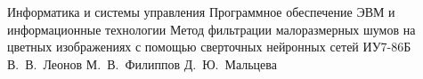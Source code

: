 \documentclass{bmstu}
\begin{document}
\def\labelitemi{---}

\makecourseworktitle
    {Информатика и системы управления} %
    {Программное обеспечение ЭВМ и информационные технологии} %
    {Метод фильтрации малоразмерных шумов на цветных изображениях с помощью сверточных нейронных сетей} %
    {ИУ7-86Б} %
    {В.~В.~Леонов} %
    {М.~В.~Филиппов} %
    {Д.~Ю.~Мальцева}
    {}
    
\setcounter{page}{5}


\maketableofcontents








\makebibliography


\end{document}
